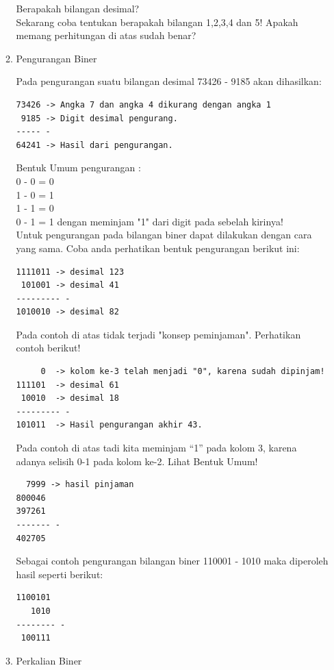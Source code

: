 \begin{enumerate}[label=(\alph*)]
\begin{enumerate}
Berapakah bilangan desimal? \\

Sekarang coba tentukan berapakah bilangan 1,2,3,4 dan 5! Apakah memang perhitungan di atas sudah benar? \\

\item Pengurangan Biner

\qquad Pada pengurangan suatu bilangan desimal 73426 - 9185 akan dihasilkan:
\begin{verbatim}
73426 -> Angka 7 dan angka 4 dikurang dengan angka 1
 9185 -> Digit desimal pengurang.
----- -
64241 -> Hasil dari pengurangan.
\end{verbatim}

Bentuk Umum pengurangan : \\
0 - 0 = 0 \\
1 - 0 = 1 \\
1 - 1 = 0 \\
0 - 1 = 1 \textrightarrow dengan meminjam "1" dari digit pada sebelah kirinya! \\
 
\quad Untuk pengurangan pada bilangan biner dapat dilakukan dengan cara yang sama. Coba anda perhatikan bentuk pengurangan berikut ini:
\begin{verbatim}
1111011 -> desimal 123
 101001 -> desimal 41
--------- -
1010010 -> desimal 82 
\end{verbatim}
\qquad Pada contoh di atas tidak terjadi "konsep peminjaman". Perhatikan contoh berikut!

\begin{verbatim}
     0  -> kolom ke-3 telah menjadi "0", karena sudah dipinjam!
111101  -> desimal 61
 10010  -> desimal 18
--------- -
101011  -> Hasil pengurangan akhir 43.
\end{verbatim}

\qquad Pada contoh di atas tadi kita meminjam “1” pada kolom 3, karena adanya selisih 0-1 pada kolom ke-2. Lihat Bentuk Umum!
\begin{verbatim}
  7999 -> hasil pinjaman
800046
397261
------- -
402705
\end{verbatim}

\qquad Sebagai contoh pengurangan bilangan biner 110001 - 1010 maka diperoleh hasil seperti berikut:
\begin{verbatim}
1100101
   1010
-------- - 
 100111
\end{verbatim}

\item Perkalian Biner


\end{enumerate}
\end{enumerate}
